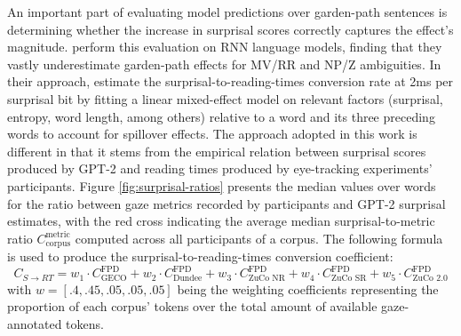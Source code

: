 \documentclass[a4paper, nobind]{templates/ociamthesis}
\begin{document}
An important part of evaluating model predictions over garden-path sentences is determining whether the increase in surprisal scores correctly captures the effect's magnitude. \textcite{schjindel-linzen-2020-single} perform this evaluation on RNN language models, finding that they vastly underestimate garden-path effects for MV/RR and NP/Z ambiguities. In their approach, \textcite{schjindel-linzen-2020-single} estimate the surprisal-to-reading-times conversion rate at 2ms per surprisal bit by fitting a linear mixed-effect model on relevant factors (surprisal, entropy, word length, among others) relative to a word and its three preceding words to account for spillover effects. The approach adopted in this work is different in that it stems from the empirical relation between surprisal scores produced by GPT-2 and reading times produced by eye-tracking experiments' participants. Figure \ref{fig:surprisal-ratios} presents the median values over words for the ratio between gaze metrics recorded by participants and GPT-2 surprisal estimates, with the red cross indicating the average median surprisal-to-metric ratio \(C_{\text{corpus}}^{\text{metric}}\) computed across all participants of a corpus. The following formula is used to produce the surprisal-to-reading-times conversion coefficient:
\begin{equation}
C_{S\rightarrow RT} = w_1 \cdot C_{\text{GECO}}^{\text{FPD}} + w_2 \cdot C_{\text{Dundee}}^{\text{FPD}} + w_3 \cdot C_{\text{ZuCo NR}}^{\text{FPD}} + w_4 \cdot C_{\text{ZuCo SR}}^{\text{FPD}} + w_5 \cdot C_{\text{ZuCo 2.0}}^{\text{FPD}}
\end{equation}
with \(w = [.4, .45, .05, .05, .05]\) being the weighting coefficients representing the proportion of each corpus' tokens over the total amount of available gaze-annotated tokens.
\end{document}
